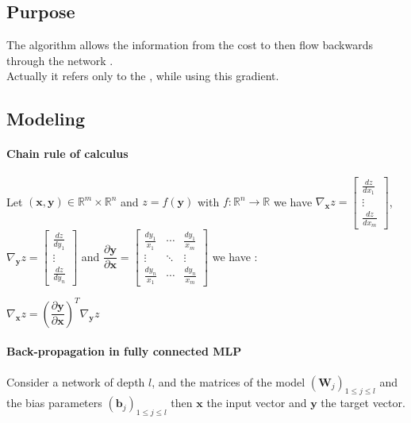 \subsection{Purpose}
The  algorithm allows the information from the cost to then flow
backwards through the network .\\
Actually it refers only to the , while
using this gradient.

\subsection{Modeling}
\paragraph{Chain rule of calculus}
Let $(\bm{x}, \bm{y}) \in \mathbb{R}^{m} \times \mathbb{R}^{n}$ and $z = f(\bm{y})$ 
with $f: \mathbb{R}^{n} \longrightarrow \mathbb{R}$
we have $\nabla_{\bm{x}}z = 
\begin{bmatrix}
    \frac{dz}{dx_{1}}\\
    \vdots \\
    \frac{dz}{dx_{m}}
\end{bmatrix}$,
$\nabla_{\bm{y}}z =
\begin{bmatrix}
    \frac{dz}{dy_{1}}\\
    \vdots \\
    \frac{dz}{dy_{n}}
\end{bmatrix}$ and 
$ \dfrac{\partial\bm{y}}{\partial\bm{x}} = 
\begin{bmatrix}
    \frac{dy_{1}}{x_{1}}  & \cdots & \frac{dy_{1}}{x_{m}}\\
    \vdots                & \ddots & \vdots\\            
    \frac{dy_{n}}{x_{1}}  & \cdots & \frac{dy_{n}}{x_{m}}
\end{bmatrix}$
we have :
\begin{center}
    $\nabla_{\bm{x}}z = \left(\dfrac{\partial\bm{y}}{\partial\bm{x}}\right)^{T}
    \nabla_{\bm{y}}z$
\end{center}

\paragraph{Back-propagation in fully connected MLP}
Consider a network of depth $l$, and the matrices of the model 
$\left(\bm{W}_{j}\right)_{1\leq j\leq l}$ and the bias parameters 
$\left(\bm{b}_{j}\right)_{1\leq j\leq l}$ then $\bm{x}$ the input vector and 
$\bm{y}$ the target vector.

